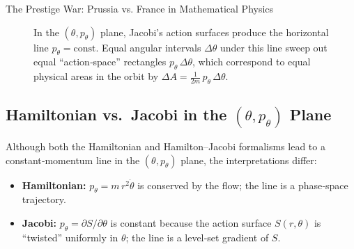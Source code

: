 \begin{HistoricalSidebar}{The Prestige War: Prussia vs. France in Mathematical Physics}
\begin{figure}[H]
\centering
{}
\caption{In the \((\theta,p_\theta)\) plane, Jacobi’s action surfaces produce the horizontal line \(p_\theta=\mathrm{const}\).  Equal angular intervals \(\Delta\theta\) under this line sweep out equal “action‐space” rectangles \(p_\theta\,\Delta\theta\), which correspond to equal physical areas in the orbit by \(\Delta A = \tfrac{1}{2m}\,p_\theta\,\Delta\theta\).}
\end{figure}

\subsection{Hamiltonian vs.\ Jacobi in the \((\theta,p_\theta)\) Plane}

Although both the Hamiltonian and Hamilton–Jacobi formalisms lead to a constant‐momentum line in the \((\theta,p_\theta)\) plane, the interpretations differ:

\begin{itemize}
  \item \textbf{Hamiltonian:}  \(p_\theta = m\,r^2\dot\theta\) is conserved by the flow; the line is a phase‐space trajectory.
  \item \textbf{Jacobi:}  \(p_\theta = \partial S/\partial \theta\) is constant because the action surface \(S(r,\theta)\) is “twisted” uniformly in \(\theta\); the line is a level‐set gradient of \(S\).
\end{itemize}





\end{HistoricalSidebar}
